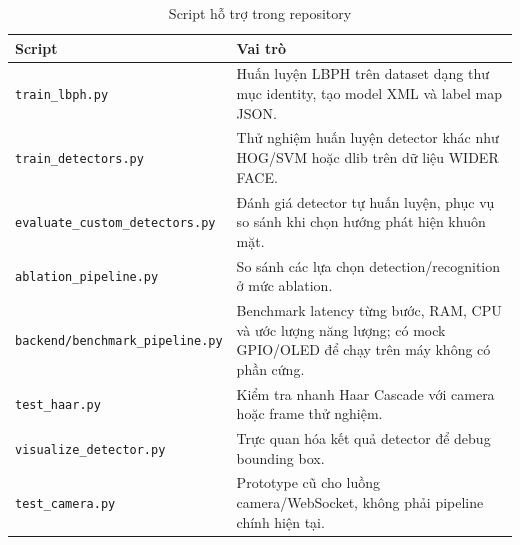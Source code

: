 \begin{table}[H]
\centering
\caption{Script hỗ trợ trong repository}
\label{tab:support_scripts}
\begin{tabularx}{\textwidth}{|l|X|}
\hline
\textbf{Script} & \textbf{Vai trò} \\
\hline
\texttt{train\_lbph.py} & Huấn luyện LBPH trên dataset dạng thư mục identity, tạo model XML và label map JSON. \\
\hline
\texttt{train\_detectors.py} & Thử nghiệm huấn luyện detector khác như HOG/SVM hoặc dlib trên dữ liệu WIDER FACE. \\
\hline
\texttt{evaluate\_custom\_detectors.py} & Đánh giá detector tự huấn luyện, phục vụ so sánh khi chọn hướng phát hiện khuôn mặt. \\
\hline
\texttt{ablation\_pipeline.py} & So sánh các lựa chọn detection/recognition ở mức ablation. \\
\hline
\texttt{backend/benchmark\_pipeline.py} & Benchmark latency từng bước, RAM, CPU và ước lượng năng lượng; có mock GPIO/OLED để chạy trên máy không có phần cứng. \\
\hline
\texttt{test\_haar.py} & Kiểm tra nhanh Haar Cascade với camera hoặc frame thử nghiệm. \\
\hline
\texttt{visualize\_detector.py} & Trực quan hóa kết quả detector để debug bounding box. \\
\hline
\texttt{test\_camera.py} & Prototype cũ cho luồng camera/WebSocket, không phải pipeline chính hiện tại. \\
\hline
\end{tabularx}
\end{table}

